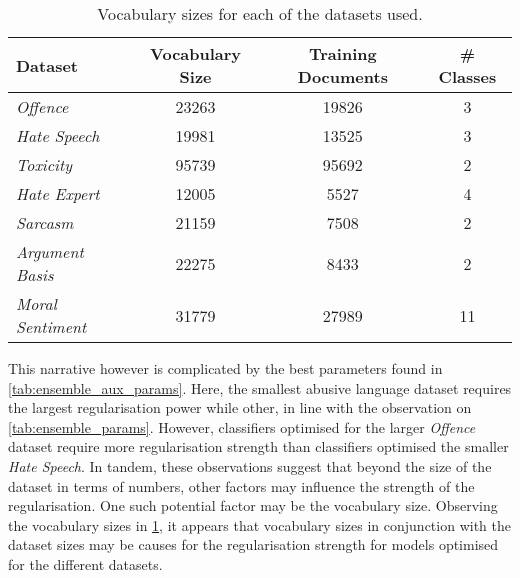 \begin{table}[]
  \centering
  \begin{tabular}{l|ccc}
    Dataset                  & Vocabulary Size & Training Documents & # Classes\\\hline
    \textit{Offence}         & 23263           & 19826              & 3\\
    \textit{Hate Speech}     & 19981           & 13525              & 3\\
    \textit{Toxicity}        & 95739           & 95692              & 2\\
    \textit{Hate Expert}     & 12005           & 5527               & 4\\
    \textit{Sarcasm}         & 21159           & 7508               & 2\\
    \textit{Argument Basis}  & 22275           & 8433               & 2\\
    \textit{Moral Sentiment} & 31779           & 27989              & 11
  \end{tabular}
  \caption{Vocabulary sizes for each of the datasets used.}
  \label{tab:aux_vocab_sizes}
\end{table}

This narrative however is complicated by the best parameters found in \cref{tab:ensemble_aux_params}.
Here, the smallest abusive language dataset requires the largest regularisation power while other, in line with the observation on \cref{tab:ensemble_params}.
However, classifiers optimised for the larger \textit{Offence} dataset require more regularisation strength than classifiers optimised the smaller \textit{Hate Speech}.
In tandem, these observations suggest that beyond the size of the dataset in terms of numbers, other factors may influence the strength of the regularisation.
One such potential factor may be the vocabulary size.
Observing the vocabulary sizes in \cref{tab:aux_vocab_sizes}, it appears that vocabulary sizes in conjunction with the dataset sizes may be causes for the regularisation strength for models optimised for the different datasets.

